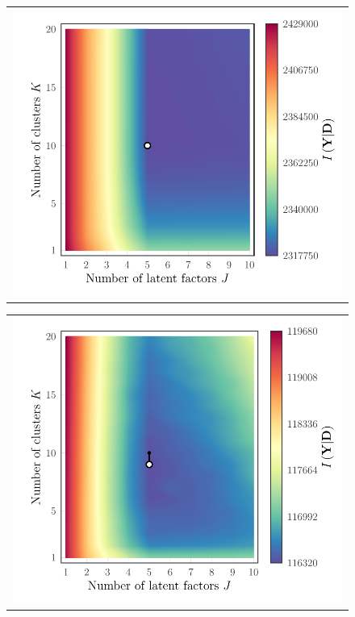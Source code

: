 \documentclass[twocolumn]{aastex62}
\begin{document}
\begin{figure}
	\begin{tabular}[b]{@{}p{}@{}}
		\centering\includegraphics[width=\linewidth]{experiments/eval-figs/eval-1-gridsearch-mml-contours.pdf} \\
	\end{tabular}
	\begin{tabular}[b]{@{}p{}@{}}
		\centering\includegraphics[width=\linewidth]{experiments/eval-figs/eval-2-gridsearch-mml-contours.pdf} \\

\end{tabular}
\end{figure}
\end{document}
